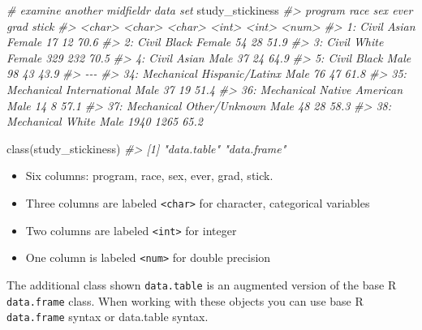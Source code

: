 \documentclass[
]{book}
\newenvironment{Shaded}{\begin{snugshade}}{\end{snugshade}}
\newcommand{\CommentTok}[1]{\textcolor[rgb]{0.56,0.35,0.01}{\textit{#1}}}
\newcommand{\FunctionTok}[1]{\textcolor[rgb]{0.00,0.00,0.00}{#1}}
\newcommand{\NormalTok}[1]{#1}
\providecommand{\tightlist}{%
  \setlength{\itemsep}{0pt}\setlength{\parskip}{0pt}}
\begin{document}
\begin{Shaded}
\begin{Highlighting}[]
\CommentTok{\# examine another midfieldr data set }
\NormalTok{study\_stickiness}
\CommentTok{\#\textgreater{}        program            race    sex  ever  grad stick}
\CommentTok{\#\textgreater{}         \textless{}char\textgreater{}          \textless{}char\textgreater{} \textless{}char\textgreater{} \textless{}int\textgreater{} \textless{}int\textgreater{} \textless{}num\textgreater{}}
\CommentTok{\#\textgreater{}  1:      Civil           Asian Female    17    12  70.6}
\CommentTok{\#\textgreater{}  2:      Civil           Black Female    54    28  51.9}
\CommentTok{\#\textgreater{}  3:      Civil           White Female   329   232  70.5}
\CommentTok{\#\textgreater{}  4:      Civil           Asian   Male    37    24  64.9}
\CommentTok{\#\textgreater{}  5:      Civil           Black   Male    98    43  43.9}
\CommentTok{\#\textgreater{} {-}{-}{-}                                                    }
\CommentTok{\#\textgreater{} 34: Mechanical Hispanic/Latinx   Male    76    47  61.8}
\CommentTok{\#\textgreater{} 35: Mechanical   International   Male    37    19  51.4}
\CommentTok{\#\textgreater{} 36: Mechanical Native American   Male    14     8  57.1}
\CommentTok{\#\textgreater{} 37: Mechanical   Other/Unknown   Male    48    28  58.3}
\CommentTok{\#\textgreater{} 38: Mechanical           White   Male  1940  1265  65.2}

\FunctionTok{class}\NormalTok{(study\_stickiness)}
\CommentTok{\#\textgreater{} [1] "data.table" "data.frame"}
\end{Highlighting}
\end{Shaded}

\begin{itemize}
\tightlist
\item
  Six columns: program, race, sex, ever, grad, stick.
\item
  Three columns are labeled \texttt{\textless{}char\textgreater{}} for character, categorical variables\\
\item
  Two columns are labeled \texttt{\textless{}int\textgreater{}} for integer
\item
  One column is labeled \texttt{\textless{}num\textgreater{}} for double precision
\end{itemize}

The additional class shown \texttt{data.table} is an augmented version of the base R \texttt{data.frame} class. When working with these objects you can use base R \texttt{data.frame} syntax or data.table syntax.
\end{document}
